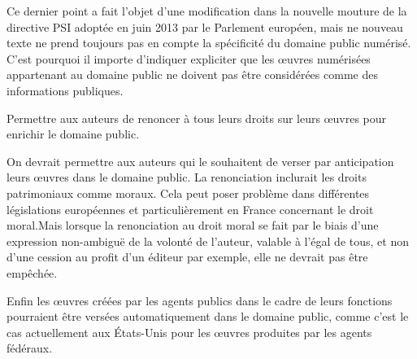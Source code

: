 Ce dernier point a fait l'objet d'une modification dans la nouvelle mouture de la directive PSI adoptée en juin 2013 par le Parlement européen, mais ne nouveau texte ne prend toujours pas en compte la spécificité du domaine public numérisé. C'est pourquoi il importe d'indiquer expliciter que les œuvres numérisées appartenant au domaine public ne doivent pas être considérées comme des informations publiques.

\begin{mesure}
Permettre aux auteurs de renoncer à tous leurs droits sur leurs œuvres pour enrichir le domaine public.
\end{mesure}

On devrait permettre aux auteurs qui le souhaitent de verser par anticipation leurs œuvres dans le domaine public. La renonciation inclurait les droits patrimoniaux comme moraux. Cela peut poser problème dans différentes législations européennes et particulièrement en France concernant le droit moral.Mais lorsque la renonciation au droit moral se fait par le biais d'une expression non-ambiguë de la volonté de l'auteur, valable à l'égal de tous, et non d'une cession au profit d'un éditeur par exemple, elle ne devrait pas être empêchée.

Enfin les œuvres créées par les agents publics dans le cadre de leurs fonctions pourraient être versées automatiquement dans le domaine public, comme c’est le cas actuellement aux États-Unis pour les œuvres produites par les agents fédéraux. 







